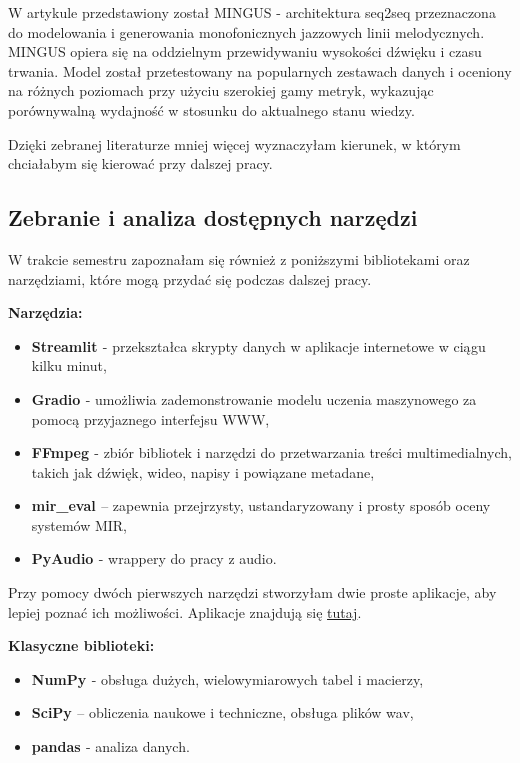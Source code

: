 \documentclass[a4paper,titleauthor]{mwart}
\begin{document}
 W artykule \cite{madaghiele2021mingus} przedstawiony został MINGUS - architektura seq2seq przeznaczona do modelowania i generowania monofonicznych jazzowych linii melodycznych. MINGUS opiera się na oddzielnym przewidywaniu wysokości dźwięku i czasu trwania. Model został przetestowany na popularnych zestawach danych i oceniony na różnych poziomach przy użyciu szerokiej gamy metryk, wykazując porównywalną wydajność w stosunku do aktualnego stanu wiedzy.

Dzięki zebranej literaturze mniej więcej wyznaczyłam kierunek, w którym chciałabym się kierować przy dalszej pracy.

\subsection{Zebranie i analiza dostępnych narzędzi}
W trakcie semestru zapoznałam się również z poniższymi bibliotekami oraz narzędziami, które mogą przydać się podczas dalszej pracy.\newline

\textbf{Narzędzia:}
\begin{itemize}
    \item \textbf{Streamlit \cite{Streamlit}} - przekształca skrypty danych w aplikacje internetowe w ciągu kilku minut,
    \item \textbf{Gradio \cite{Gradio}} - umożliwia zademonstrowanie modelu uczenia maszynowego za pomocą przyjaznego interfejsu WWW,
    \item \textbf{FFmpeg \cite{FFmpeg}} - zbiór bibliotek i narzędzi do przetwarzania treści multimedialnych, takich jak dźwięk, wideo, napisy i powiązane metadane,
    \item \textbf{mir\_eval \cite{mireval}} – zapewnia przejrzysty, ustandaryzowany i prosty sposób oceny systemów MIR,
    \item \textbf{PyAudio \cite{pyaudio}} - wrappery do pracy z audio.
\end{itemize}
Przy pomocy dwóch pierwszych narzędzi stworzyłam dwie proste aplikacje, aby lepiej poznać ich możliwości. Aplikacje znajdują się \href{https://github.com/ERoszczyk/MIR}{tutaj}.\newline

\textbf{Klasyczne biblioteki:}
\begin{itemize}
    \item \textbf{NumPy \cite{numpy}} - obsługa dużych, wielowymiarowych tabel i macierzy,
    \item \textbf{SciPy \cite{scipy}} – obliczenia naukowe i techniczne, obsługa plików wav,
    \item \textbf{pandas \cite{pandas}} - analiza danych.\newline
\end{itemize}
\end{document}

